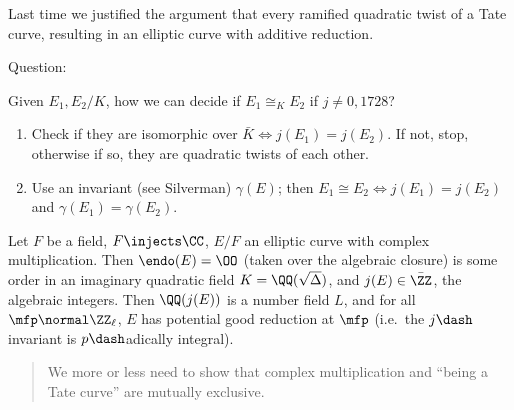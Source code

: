 Last time we justified the argument that every ramified quadratic twist
of a Tate curve, resulting in an elliptic curve with additive reduction.

Question:

Given \(E_1, E_2/K\), how we can decide if \(E_1 \cong_K E_2\) if
\(j\neq 0,1728\)?

\begin{enumerate}
\def\labelenumi{\arabic{enumi}.}
\tightlist
\item
  Check if they are isomorphic over \(\bar K \iff j(E_1) = j(E_2)\). If
  not, stop, otherwise if so, they are quadratic twists of each other.
\item
  Use an invariant (see Silverman) \(\gamma(E)\); then
  \(E_1 \cong E_2 \iff j(E_1) = j(E_2)\) and
  \(\gamma(E_1) = \gamma(E_2)\).
\end{enumerate}

\begin{description}
\tightlist
\item[Proposition (An Application)]
Let \(F\) be a field, \(F \injects \CC\), \(E/F\) an elliptic curve with
complex multiplication. Then \(\endo(E) = \OO\) (taken over the
algebraic closure) is some order in an imaginary quadratic field
\(K = \QQ(\sqrt{\Delta})\), and \(j(E) \in \bar{\ZZ}\), the algebraic
integers. Then \(\QQ(j(E))\) is a number field \(L\), and for all
\(\mfp \normal \ZZ_\ell\), \(E\) has potential good reduction at
\(\mfp\) (i.e.~the \(j\dash\)invariant is \(p\dash\)adically integral).
\end{description}

\begin{quote}
We more or less need to show that complex multiplication and ``being a
Tate curve'' are mutually exclusive.
\end{quote}

